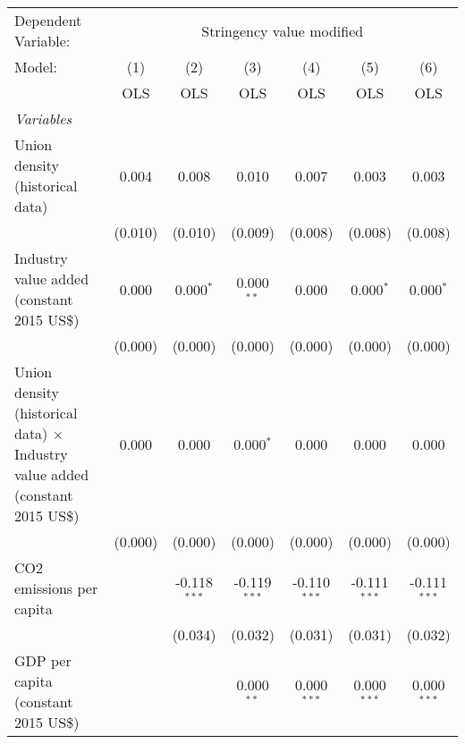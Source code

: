 
\begingroup
\centering
\begin{tabular}{lcccccc}
   \toprule
   Dependent Variable: & \multicolumn{6}{c}{Stringency value modified}\\
   Model:                                                                               & (1)     & (2)            & (3)            & (4)            & (5)            & (6)\\  
                                                                                        &  OLS    & OLS            & OLS            & OLS            & OLS            & OLS\\  
   \midrule
   \emph{Variables}\\
   Union density (historical data)                                                      & 0.004   & 0.008          & 0.010          & 0.007          & 0.003          & 0.003\\   
                                                                                        & (0.010) & (0.010)        & (0.009)        & (0.008)        & (0.008)        & (0.008)\\   
   Industry value added (constant 2015 US\$)                                            & 0.000   & 0.000$^{*}$    & 0.000$^{**}$   & 0.000          & 0.000$^{*}$    & 0.000$^{*}$\\   
                                                                                        & (0.000) & (0.000)        & (0.000)        & (0.000)        & (0.000)        & (0.000)\\   
   Union density (historical data) $\times$ Industry value added (constant 2015 US\$)   & 0.000   & 0.000          & 0.000$^{*}$    & 0.000          & 0.000          & 0.000\\   
                                                                                        & (0.000) & (0.000)        & (0.000)        & (0.000)        & (0.000)        & (0.000)\\   
   CO2 emissions per capita                                                             &         & -0.118$^{***}$ & -0.119$^{***}$ & -0.110$^{***}$ & -0.111$^{***}$ & -0.111$^{***}$\\   
                                                                                        &         & (0.034)        & (0.032)        & (0.031)        & (0.031)        & (0.032)\\   
   GDP per capita (constant 2015 US\$)                                                  &         &                & 0.000$^{**}$   & 0.000$^{***}$  & 0.000$^{***}$  & 0.000$^{***}$\\   

\end{tabular}
